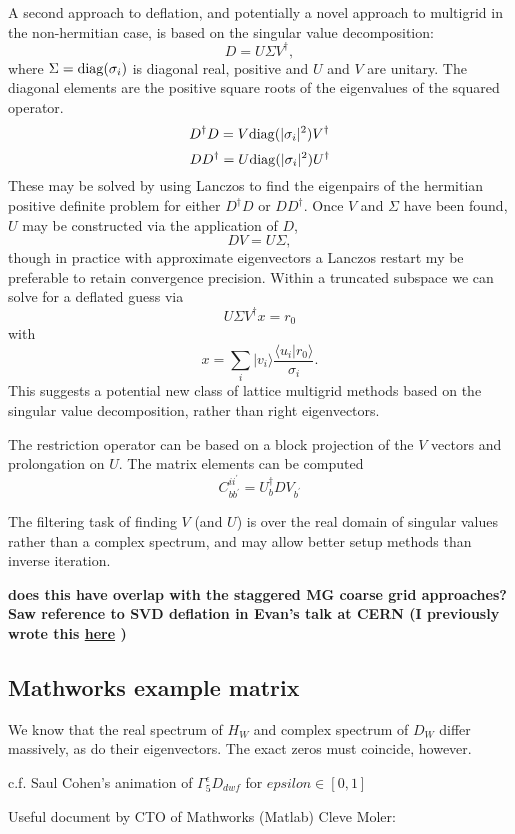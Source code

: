 \documentclass[letter,10pt]{report}
\begin{document}
A second approach to deflation, and potentially a novel
approach to multigrid in the non-hermitian  case, is
based on the singular value decomposition:
$$
D = U \Sigma V^\dagger,
$$
where $\Sigma = {\rm diag} (\sigma_i)$ is diagonal real, positive and $U$ and $V$ are unitary. The diagonal elements are the positive square roots
of the eigenvalues of the squared operator.
$$
D^\dagger D = V {\rm diag} (|\sigma_i|^2) V^\dagger
$$
$$
D D^\dagger = U {\rm diag} (|\sigma_i|^2) U^\dagger
$$
These may be solved by using Lanczos to find the eigenpairs
of the hermitian positive
definite problem for either $D^\dagger D$ or $D D^\dagger$.
Once $V$ and $\Sigma$ have been found, $U$ may be constructed
via the application of $D$, 
$$
D V = U \Sigma,
$$
though in practice with approximate eigenvectors a Lanczos restart my be preferable to retain convergence
precision.
Within a truncated subspace we can solve for a deflated guess via
$$
U \Sigma V^\dagger x = r_0
$$
with 
$$
x = \sum_i |v_i\rangle \frac{\langle u_i| r_0\rangle}{\sigma_i}.
$$
This suggests a potential new class of lattice multigrid methods based on the
singular value decomposition, rather than right eigenvectors.

The restriction operator can be based on a block projection of the
$V$ vectors and prolongation on $U$. The matrix elements can be computed
$$
C^{ii^\prime}_{bb^\prime} = U^\dagger_b D V_{b^\prime}
$$

The filtering task of finding $V$ (and $U$) is over the real domain of singular
values rather than a complex spectrum, and may allow better setup methods
than inverse iteration.

{\bf does this have overlap with the staggered MG coarse grid approaches? Saw reference to SVD deflation in
  Evan's talk at CERN
  (I previously wrote this 
  \href{https://www.overleaf.com/read/vqywyddshbnr#b87e9e}{here}
  )
}

\subsection{Mathworks example matrix}

We know that the real spectrum of $H_W$ and complex spectrum of $D_W$ differ massively, as do their eigenvectors.
The exact zeros must coincide, however.

c.f. Saul Cohen's animation of $\Gamma_5^{\epsilon} D_{dwf}$ for $epsilon \in [0,1]$

Useful document by CTO of Mathworks (Matlab) Cleve Moler:
\end{document}
